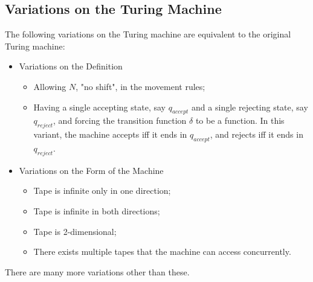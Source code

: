 \documentclass{report}
\begin{document}
			\subsection{Variations on the Turing Machine} \label{var_TM}
			The following variations on the Turing machine are equivalent to the original Turing machine:
			\begin{itemize}
				\item Variations on the Definition
				\begin{itemize}
					\item Allowing $N$, "no shift", in the movement rules;
					\item Having a single accepting state, say $q_{accept}$ and a single rejecting state, say $q_{reject}$, and forcing the transition function $\delta$ to be a function. In this variant, the machine accepts iff it ends in $q_{accept}$, and rejects iff it ends in $q_{reject}$.
				\end{itemize}
				\item Variations on the Form of the Machine
				\begin{itemize}
					\item Tape is infinite only in one direction;
					\item Tape is infinite in both directions;
					\item Tape is 2-dimensional;
					\item There exists multiple tapes that the machine can access concurrently.
				\end{itemize}
			\end{itemize}
			There are many more variations other than these.
\end{document}
